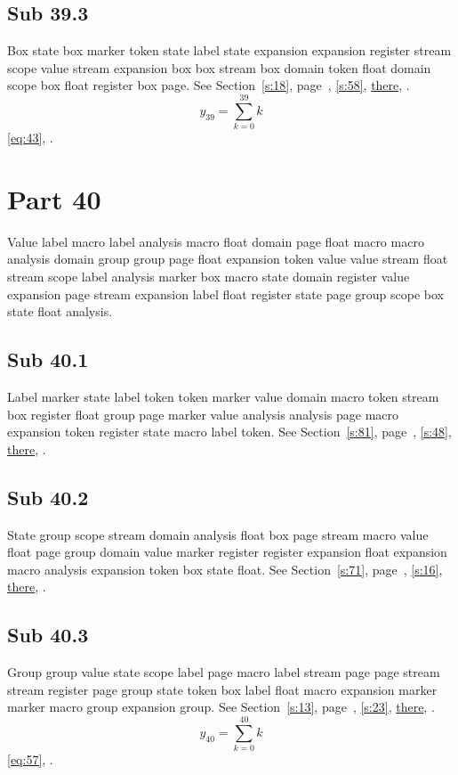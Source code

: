 \documentclass[11pt]{article}
\begin{document}
\subsection{Sub 39.3}\label{ss:39.3} Box state box marker token state label state expansion expansion register stream scope value stream expansion box box stream box domain token float domain scope box float register box page. See Section~\ref{s:18}, page~\pageref{ss:81.1}, \cref{s:58}, \hyperref[s:45]{there}, \cite{k51,k18}.
\begin{equation}y_{39}=\sum_{k=0}^{39}k\label{eq:39}\end{equation} \eqref{eq:43}, .
\section{Part 40}\label{s:40}
Value label macro label analysis macro float domain page float macro macro analysis domain group group page float expansion token value value stream float stream scope label analysis marker box macro state domain register value expansion page stream expansion label float register state page group scope box state float analysis.
\subsection{Sub 40.1}\label{ss:40.1} Label marker state label token token marker value domain macro token stream box register float group page marker value analysis analysis page macro expansion token register state macro label token. See Section~\ref{s:81}, page~\pageref{ss:72.1}, \cref{s:48}, \hyperref[s:73]{there}, \cite{k2,k27}.
\subsection{Sub 40.2}\label{ss:40.2} State group scope stream domain analysis float box page stream macro value float page group domain value marker register register expansion float expansion macro analysis expansion token box state float. See Section~\ref{s:71}, page~\pageref{ss:55.2}, \cref{s:16}, \hyperref[s:64]{there}, \cite{k100,k68}.
\subsection{Sub 40.3}\label{ss:40.3} Group group value state scope label page macro label stream page page stream stream register page group state token box label float macro expansion marker marker macro group expansion group. See Section~\ref{s:13}, page~\pageref{ss:75.2}, \cref{s:23}, \hyperref[s:54]{there}, \cite{k46,k95}.
\begin{equation}y_{40}=\sum_{k=0}^{40}k\label{eq:40}\end{equation} \eqref{eq:57}, .
\end{document}
